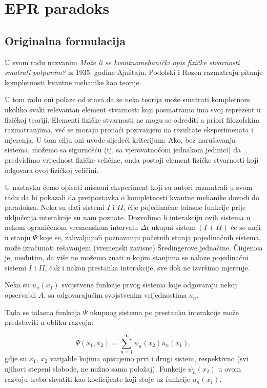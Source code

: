 \chapter{EPR paradoks}
\section{Originalna formulacija}
U svom radu nazvanim {\it{Može li se kvantnomehanički opis fizičke stvarnosti smatrati potpunim?}} iz 1935. godine Ajnštajn, Podolski i Rozen razmatraju pitanje kompletnosti kvantne mehanike kao teorije.

U tom radu oni polaze od stava da se neka teorija može smatrati kompletnom ukoliko  svaki relevantan element stvarnosti koji posmatramo ima svoj reprezent u fizičkoj teoriji.
Elementi fizičke stvarnosti ne mogu se odrediti a priori filozofskim razmatranjima, već se moraju pronaći pozivanjem na rezultate eksperimenata i mjerenja. U tom cilju oni uvode sljedeći kriterijum: Ako, bez narušavanja sistema, možemo sa sigurnošću (tj. sa vjerovatnoćom jednakom jedinici) da predvidimo vrijednost fizičke veličine, onda postoji element fizičke stvarnosti koji odgovara ovoj fizičkoj veličini.


U nastavku ćemo opisati misaoni eksperiment koji su autori razmatrali u svom radu da bi pokazali da pretpostavka o kompletnosti kvantne mehanike dovodi do paradoksa.
Neka su dati sistemi $I$ i $II$, čije pojedinačne talasne funkcije prije uklju\v cenja interakcije su nam poznate. Dozvolimo li interakciju ovih sistema u nekom ograničenom vremenskom intervalu $\Delta t$ ukupni sistem $(I + II)$ će se naći u stanju $\Psi$ koje se, zahvaljujući poznavanju početnih stanja pojedinačnih sistema, može izračunati rešavanjem (vremenski zavisne) Šredingerove jednačine.
Činjenica je, međutim, da više ne možemo znati u kojim stanjima se nalaze pojedinačni sistemi $I$ i $II$, čak i nakon prestanka interakcije, sve dok ne izvršimo mjerenje.

Neka su $u_n(x_1)$ svojstvene funkcije prvog sistema koje odgovaraju nekoj opservabli $A$, sa odgovarajućim svojstvenim vrijednostima $a_n$.

Tada se talasna funkcija $\Psi$ ukupnog sistema po prestanku interakcije može predstaviti u obliku razvoja:

\begin{equation}
    \Psi(x_1, x_2) = \sum_{n=1}^{\infty} \psi_n(x_2)u_n(x_1), \label{eq:talasna_funkcija_ukupnog_sistema_nakon_interakcije}
\end{equation}
gdje su $x_1$, $x_2$ varijable kojima opisujemo prvi i drugi sistem, respektivno (svi njihovi stepeni slobode, ne nužno samo položaj).
Funkcije $\psi_n(x_2)$ u ovom razvoju treba shvatiti kao koeficijente koji stoje uz funkcije $u_n(x_1)$.

